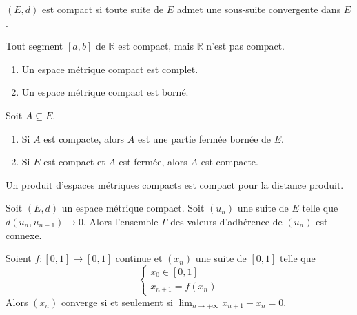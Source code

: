   \begin{theorem}
    $(E,d)$ est compact si toute suite de $E$ admet une sous-suite convergente dans $E$.
  \end{theorem}

  \begin{example}
    Tout segment $[a,b]$ de $\mathbb{R}$ est compact, mais $\mathbb{R}$ n'est pas compact.
  \end{example}

  \begin{proposition}
    \begin{enumerate}[label=(\roman*)]
      \item Un espace métrique compact est complet.
      \item Un espace métrique compact est borné.
    \end{enumerate}
  \end{proposition}

  \begin{proposition}
    Soit $A \subseteq E$.
    \begin{enumerate}[label=(\roman*)]
      \item Si $A$ est compacte, alors $A$ est une partie fermée bornée de $E$.
      \item Si $E$ est compact et $A$ est fermée, alors $A$ est compacte.
    \end{enumerate}
  \end{proposition}

  \begin{proposition}
    Un produit d'espaces métriques compacts est compact pour la distance produit.
  \end{proposition}


  \begin{application}
    Soit $(E, d)$ un espace métrique compact. Soit $(u_n)$ une suite de $E$ telle que $d(u_n,u_{n-1}) \longrightarrow 0$. Alors l'ensemble $\Gamma$ des valeurs d'adhérence de $(u_n)$ est connexe.
  \end{application}

  \begin{corollary}
    Soient $f : [0, 1] \rightarrow [0, 1]$ continue et $(x_n)$ une suite de $[0, 1]$ telle que
    \[ \begin{cases} x_0 \in [0, 1] \\ x_{n+1} = f(x_n) \end{cases} \]
    Alors $(x_n)$ converge si et seulement si $\lim_{n \rightarrow +\infty } x_{n+1} - x_n = 0$.
  \end{corollary}

